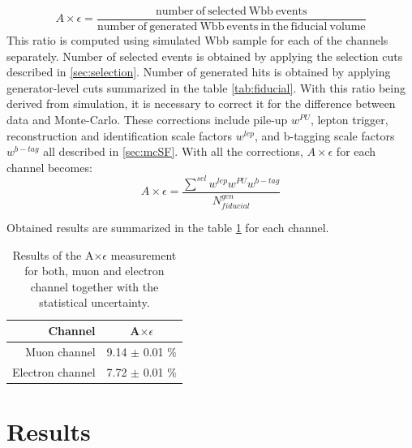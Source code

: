 \begin{equation}
A\times \epsilon=\frac{\mathrm{number\ of\ selected\ Wbb\ events}}{\mathrm{number\ of\ generated\ Wbb\ events\ in\ the\ fiducial\ volume}}
\end{equation}
This ratio is computed using simulated Wbb sample for each of the channels separately. Number of selected events is obtained by applying the selection cuts described in \ref{sec:selection}. Number of generated hits is obtained by applying generator-level cuts summarized in the table \ref{tab:fiducial}. With this ratio being derived from simulation, it is necessary to correct it for the difference between data and Monte-Carlo. These corrections include pile-up  $w^{PU}$, lepton trigger, reconstruction and identification scale factors $w^{lep}$, and b-tagging scale factors $w^{b-tag}$ all described in \ref{sec:mcSF}. With all the corrections, $A\times \epsilon$ for each channel becomes:
\begin{equation}
A\times \epsilon = \frac{\sum^{sel} w^{lep} w^{PU} w^{b-tag}}{N_{fiducial}^{gen}}
\end{equation}

Obtained results are summarized in the table \ref{tab:AE} for each channel.

\begin{table}[!htb]
\begin{center}
   \begin{tabular} {r c} \hline \hline
        Channel         & A$\times \epsilon$ \\
        \hline
        Muon channel         & 9.14 $\pm$ 0.01 $\%$ \\
        Electron channel     & 7.72 $\pm$ 0.01 $\%$ \\
        \hline\hline
   \end{tabular}
\caption{Results of the A$\times \epsilon$ measurement for both, muon and electron channel together with the statistical uncertainty.}
\label{tab:AE}
\end{center}
\end{table}




\section{Results}
\label{sec:res}

